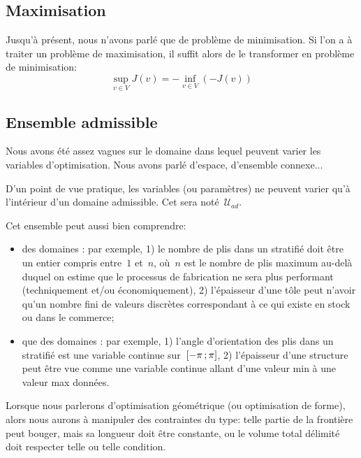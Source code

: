 \subsection{Maximisation}

Jusqu'à présent, nous n'avons parlé que de problème de minimisation.
Si l'on a à traiter un problème de maximisation, il suffit alors de le transformer en problème de minimisation:
\begin{equation}
\sup_{v\in V} J(v)=-\inf_{v\in V} (-J(v))
\end{equation}

\medskip
\subsection{Ensemble admissible}

Nous avons été assez vagues sur le domaine dans lequel peuvent varier les variables d'optimisation. Nous avons parlé d'espace, d'ensemble connexe...

D'un point de vue pratique, les variables (ou paramètres) ne peuvent varier qu'à l'intérieur d'un domaine admissible. Cet  sera noté~$\mathcal{U}_{ad}$.

\medskip
Cet ensemble peut aussi bien comprendre:
\begin{itemize}
   \item des domaines : par exemple, 1) le nombre de plis dans un stratifié doit être un entier compris entre~$1$ et~$n$, où~$n$ est le nombre de plis maximum au-delà duquel on estime que le processus de fabrication ne sera plus performant (techniquement et/ou économiquement), 2) l'épaisseur d'une tôle peut n'avoir qu'un nombre fini de valeurs discrètes correspondant à ce qui existe en stock ou dans le commerce;
   \item que des domaines : par exemple, 1) l'angle d'orientation des plis dans un stratifié est une variable continue sur~$\mathopen{[}-\pi\,;\pi\mathclose{]}$, 2) l'épaisseur d'une structure peut être vue comme une variable continue allant d'une valeur min à une valeur max données.
\end{itemize}

Lorsque nous parlerons d'optimisation géométrique (ou optimisation de forme), alors nous aurons à manipuler des contraintes du type: telle partie de la frontière peut bouger, mais sa longueur doit être constante, ou le volume total délimité doit respecter telle ou telle condition.

